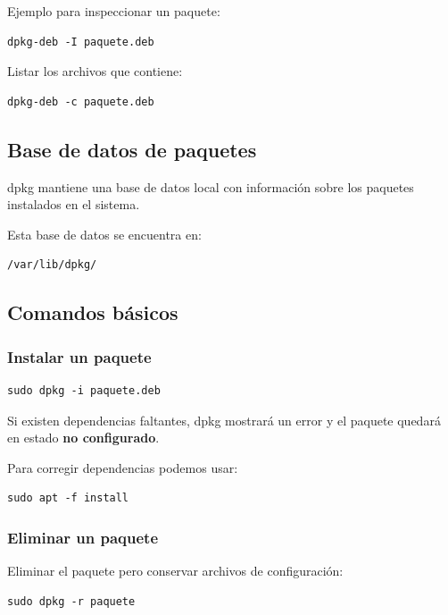 \documentclass[11pt, letterpaper]{article}
\begin{document}
Ejemplo para inspeccionar un paquete:

\begin{verbatim}
dpkg-deb -I paquete.deb
\end{verbatim}

Listar los archivos que contiene:

\begin{verbatim}
dpkg-deb -c paquete.deb
\end{verbatim}
\subsection{Base de datos de paquetes}
\label{sec:org117b6a7}

dpkg mantiene una base de datos local con información sobre los paquetes
instalados en el sistema.

Esta base de datos se encuentra en:

\begin{verbatim}
/var/lib/dpkg/
\end{verbatim}
\subsection{Comandos básicos}
\label{sec:org28b28c1}

\subsubsection{Instalar un paquete}
\label{sec:org3781aed}

\begin{verbatim}
sudo dpkg -i paquete.deb
\end{verbatim}

Si existen dependencias faltantes, dpkg mostrará un error y el paquete quedará
en estado \textbf{no configurado}.

Para corregir dependencias podemos usar:

\begin{verbatim}
sudo apt -f install
\end{verbatim}
\subsubsection{Eliminar un paquete}
\label{sec:org878f43a}

Eliminar el paquete pero conservar archivos de configuración:

\begin{verbatim}
sudo dpkg -r paquete
\end{verbatim}
\end{document}
